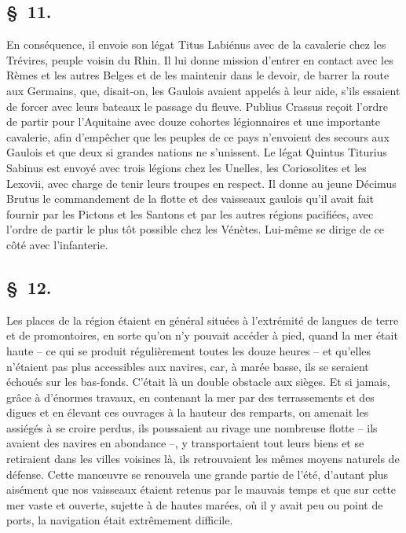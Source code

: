 \documentclass[french,twoside]{book} %
\begin{document}
\subsection[{§ 11.}]{ \textsc{§ 11.} }
\noindent En conséquence, il envoie son légat Titus Labiénus avec de la cavalerie chez les Trévires, peuple voisin du Rhin. Il lui donne mission d’entrer en contact avec les Rèmes et les autres Belges et de les maintenir dans le devoir, de barrer la route aux Germains, que, disait-on, les Gaulois avaient appelés à leur aide, s’ils essaient de forcer avec leurs bateaux le passage du fleuve. Publius Crassus reçoit l’ordre de partir pour l’Aquitaine avec douze cohortes légionnaires et une importante cavalerie, afin d’empêcher que les peuples de ce pays n’envoient des secours aux Gaulois et que deux si grandes nations ne s’unissent. Le légat Quintus Titurius Sabinus est envoyé avec trois légions chez les Unelles, les Coriosolites et les Lexovii, avec charge de tenir leurs troupes en respect. Il donne au jeune Décimus Brutus le commandement de la flotte et des vaisseaux gaulois qu’il avait fait fournir par les Pictons et les Santons et par les autres régions pacifiées, avec l’ordre de partir le plus tôt possible chez les Vénètes. Lui-même se dirige de ce côté avec l’infanterie.
\subsection[{§ 12.}]{ \textsc{§ 12.} }
\noindent Les places de la région étaient en général situées à l’extrémité de langues de terre et de promontoires, en sorte qu’on n’y pouvait accéder à pied, quand la mer était haute – ce qui se produit régulièrement toutes les douze heures – et qu’elles n’étaient pas plus accessibles aux navires, car, à marée basse, ils se seraient échoués sur les bas-fonds. C'était là un double obstacle aux sièges. Et si jamais, grâce à d’énormes travaux, en contenant la mer par des terrassements et des digues et en élevant ces ouvrages à la hauteur des remparts, on amenait les assiégés à se croire perdus, ils poussaient au rivage une nombreuse flotte – ils avaient des navires en abondance –, y transportaient tout leurs biens et se retiraient dans les villes voisines là, ils retrouvaient les mêmes moyens naturels de défense. Cette manœuvre se renouvela une grande partie de l’été, d’autant plus aisément que nos vaisseaux étaient retenus par le mauvais temps et que sur cette mer vaste et ouverte, sujette à de hautes marées, où il y avait peu ou point de ports, la navigation était extrêmement difficile.
\end{document}
